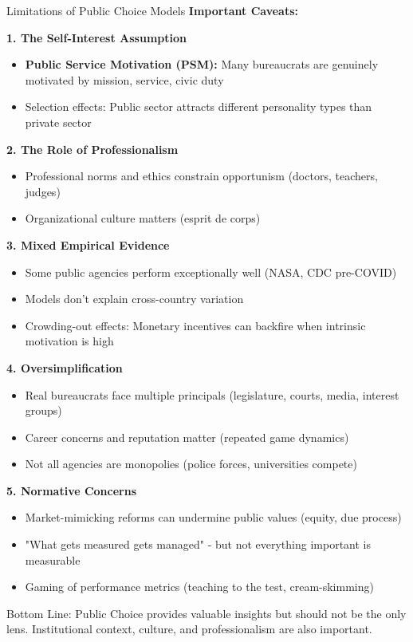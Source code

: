 \documentclass[10pt]{beamer}
\begin{document}
\begin{frame}[allowframebreaks]{Limitations of Public Choice Models}
\textbf{Important Caveats:}


\textbf{1. The Self-Interest Assumption}
\begin{itemize}
\item \textbf{Public Service Motivation (PSM):} Many bureaucrats are genuinely motivated by mission, service, civic duty
\item Selection effects: Public sector attracts different personality types than private sector
\end{itemize}


\textbf{2. The Role of Professionalism}
\begin{itemize}
\item Professional norms and ethics constrain opportunism (doctors, teachers, judges)
\item Organizational culture matters (esprit de corps)
\end{itemize}

\framebreak

\textbf{3. Mixed Empirical Evidence}
\begin{itemize}
\item Some public agencies perform exceptionally well (NASA, CDC pre-COVID)
\item Models don't explain cross-country variation
\item Crowding-out effects: Monetary incentives can backfire when intrinsic motivation is high
\end{itemize}


\textbf{4. Oversimplification}
\begin{itemize}
\item Real bureaucrats face multiple principals (legislature, courts, media, interest groups)
\item Career concerns and reputation matter (repeated game dynamics)
\item Not all agencies are monopolies (police forces, universities compete)
\end{itemize}

\framebreak

\textbf{5. Normative Concerns}
\begin{itemize}
\item Market-mimicking reforms can undermine public values (equity, due process)
\item "What gets measured gets managed" - but not everything important is measurable
\item Gaming of performance metrics (teaching to the test, cream-skimming)
\end{itemize}


\alert{Bottom Line:} Public Choice provides valuable insights but should not be the only lens. Institutional context, culture, and professionalism are also important.
\end{frame}
\end{document}
